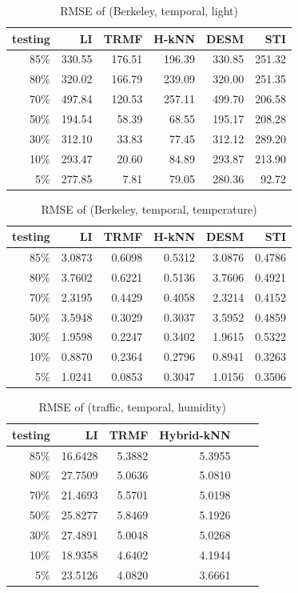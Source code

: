 \begin{table}[htbp]
\centering
\caption{RMSE of (Berkeley, temporal, light)}
\label{table:berkeley_temporal_light}
\begin{tabular}{ r | r r r r r}
	testing	&LI	&TRMF	&H-kNN	&DESM	&STI\\ \hline
	85\%	&330.55	&176.51	&196.39	&330.85	&251.32\\ 
	80\%	&320.02	&166.79	&239.09	&320.00	&251.35\\
	70\%	&497.84	&120.53	&257.11	&499.70	&206.58\\
	50\%	&194.54	&58.39	&68.55	&195.17	&208.28\\
	30\%	&312.10	&33.83	&77.45	&312.12	&289.20\\
	10\%	&293.47	&20.60	&84.89	&293.87	&213.90\\
	 5\%	&277.85	&7.81	&79.05	&280.36	& 92.72
\end{tabular}
\end{table}


\begin{table}[htbp]
\centering
\caption{RMSE of (Berkeley, temporal, temperature)}
\label{table:berkeley_temporal_tem}
\begin{tabular}{ r | r r r r r}
	testing	&LI	&TRMF	&H-kNN	&DESM	&STI\\ \hline
	85\%	&3.0873	&0.6098	&0.5312	&3.0876	&0.4786\\ 
	80\%	&3.7602	&0.6221	&0.5136	&3.7606	&0.4921\\
	70\%	&2.3195	&0.4429	&0.4058	&2.3214	&0.4152\\
	50\%	&3.5948	&0.3029	&0.3037	&3.5952	&0.4859\\
	30\%	&1.9598	&0.2247	&0.3402	&1.9615	&0.5322\\
	10\%	&0.8870	&0.2364	&0.2796	&0.8941	&0.3263\\
	 5\%	&1.0241	&0.0853	&0.3047	&1.0156	&0.3506
\end{tabular}
\end{table}

\begin{table} [htbp]
\centering
\caption{RMSE of (traffic, temporal, humidity)}
\label{table:traffic_temporal_hum}
\begin{tabular}{ r | r r r r r}
	testing	&LI	&TRMF	&Hybrid-kNN \\ \hline
	85\%	&16.6428	&5.3882	&5.3955\\ 
	80\%	&27.7509	&5.0636	&5.0810\\
	70\%	&21.4693	&5.5701	&5.0198\\
	50\%	&25.8277	&5.8469	&5.1926\\
	30\%	&27.4891	&5.0048	&5.0268\\
	10\%	&18.9358	&4.6402	&4.1944\\
	 5\%	&23.5126	&4.0820	&3.6661
\end{tabular}
\end{table}


